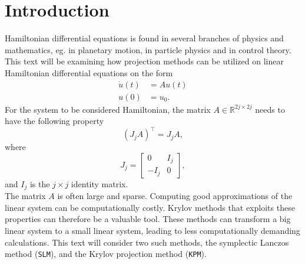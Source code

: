 \chapter{Introduction} %
Hamiltonian differential equations is found in several branches of physics and mathematics, eg. in planetary motion, in particle physics and in control theory. This text will be examining how projection methods can be utilized on linear Hamiltonian differential equations on the form 
\begin{equation} 
\begin{aligned}
\dot{u}(t) &= A u(t)\\
u(0)&= u_0.
\end{aligned}
\label{eqn:PDE}
\end{equation} 
For the system to be considered Hamiltonian, the matrix $A \in \mathbb{R}^{2j \times 2j}$ needs to have the following property  \cite{Hamiltonian}
\begin{equation*}
(J_jA)^{\top} = J_j A,
\end{equation*}
where
\begin{equation*}
J_j = 
\begin{bmatrix}
0&I_j\\-I_j&0
\end{bmatrix},
\end{equation*}
and $I_j$ is the $j \times j$ identity matrix. \\

\noindent The matrix $A$ is often large and sparse. Computing good approximations of the linear system can be computationally costly. Krylov methods that exploits these properties can therefore be a valuable tool. These methods can transform a big linear system to a small linear system, leading to less computationally demanding calculations. This text will consider two such methods, the symplectic Lanczos method (\texttt{SLM}), and the Krylov projection method (\texttt{KPM}). 

